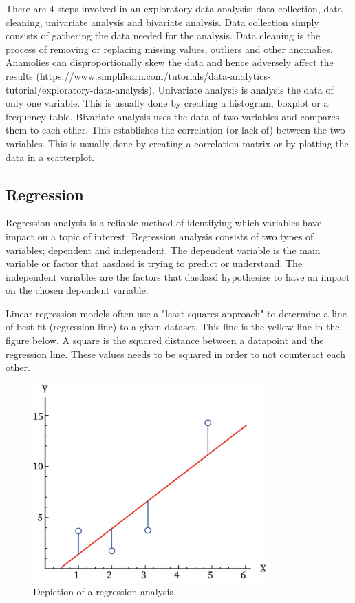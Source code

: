 There are 4 steps involved in an exploratory data analysis: data collection, data cleaning, univariate analysis and bivariate analysis. 
Data collection simply consists of gathering the data needed for the analysis. 
Data cleaning is the process of removing or replacing missing values, outliers and other anomalies. Anamolies can disproportionally skew the data and hence adversely affect the results (https://www.simplilearn.com/tutorials/data-analytics-tutorial/exploratory-data-analysis).
Univariate analysis is analysis the data of only one variable. This is usually done by creating a histogram, boxplot or a frequency table.  
Bivariate analysis uses the data of two variables and compares them to each other. This establishes the correlation (or lack of) between the two variables. This is usually done by creating a correlation matrix or by plotting the data in a scatterplot. 

\subsection{Regression}
Regression analysis is a reliable method of identifying which variables have impact on a topic of interest. Regression analysis consists of two types of variables; dependent and independent. The dependent variable is the main variable or factor that aasdasd is trying to predict or understand. The independent variables are the factors that dasdasd hypothesize to have an impact on the chosen dependent variable. 

Linear regression models often use a "least-squares approach" to determine a line of best fit (regression line) to a given dataset. This line is the yellow line in the figure below. A square is the squared distance between a datapoint and the regression line. These values needs to be squared in order to not counteract each other.   

\begin{figure}[H]
    \centering
    \includegraphics[width=0.8\textwidth]{data/Figures/Regression/regression.jpeg}
    \caption[Depiction of a regression analysis]{Depiction of a regression analysis.}\label{fig:Regression}
\end{figure}

